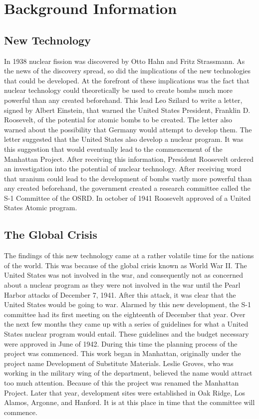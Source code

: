 \documentclass[11 pt, twoside]{article}
\begin{document}
\section{Background Information}

\subsection{New Technology}
	In 1938 nuclear fission was discovered by Otto Hahn and Fritz Strassmann. As the news of the discovery spread, so did the implications of the new technologies that could be developed. At the forefront of these implications was the fact that nuclear technology could theoretically be used to create bombs much more powerful than any created beforehand. This lead Leo Szilard to write a letter, signed by Albert Einstein, that warned the United States President, Franklin D. Roosevelt, of the potential for atomic bombs to be created. The letter also warned about the possibility that Germany would attempt to develop them. The letter suggested that the United States also develop a nuclear program. It was this suggestion that would eventually lead to the commencement of the Manhattan Project. After receiving this information, President Roosevelt ordered an investigation into the potential of nuclear technology. After receiving word that uranium could lead to the development of bombs vastly more powerful than any created beforehand, the government created a research committee called the S-1 Committee of the OSRD. In october of 1941 Roosevelt approved of a United States Atomic program.
\subsection{The Global Crisis}
	The findings of this new technology came at a rather volatile time for the nations of the world. This was because of the global crisis known as World War II. The United States was not involved in the war, and consequently not as concerned about a nuclear program as they were not involved in the war until the Pearl Harbor attacks of December 7, 1941. After this attack, it was clear that the United States would be going to war. Alarmed by this new development, the S-1 committee had its first meeting on the eighteenth of December that year. Over the next few months they came up with a series of guidelines for what a United States nuclear program would entail. These guidelines and the budget necessary were approved in June of 1942. During this time the planning process of the project was commenced. This work began in Manhattan, originally under the project name Development of Substitute Materials. Leslie Groves, who was working in the military wing of the department, believed the name would attract too much attention. Because of this the project was renamed the Manhattan Project. Later that year, development sites were established in Oak Ridge, Los Alamos, Argonne, and Hanford. It is at this place in time that the committee will commence. 
\end{document}
